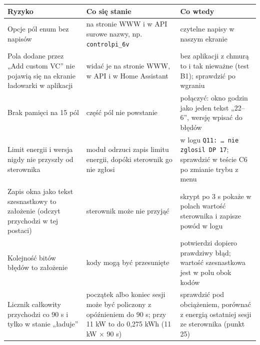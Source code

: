 \documentclass[11pt,a4paper]{article}
\begin{document}
\begin{longtable}{>{\raggedright\arraybackslash}p{4.64cm}>{\raggedright\arraybackslash}p{4.61cm}>{\raggedright\arraybackslash}p{6.03cm}}
\toprule
\rowcolor{apteallight}\textbf{Ryzyko} & \textbf{Co się stanie} & \textbf{Co wtedy} \\
\midrule\endhead
\bottomrule\endfoot
Opcje pól enum bez napisów & na stronie WWW i w API surowe nazwy, np. \texttt{controlpi\_6v} & czytelne napisy w naszym ekranie \\
Pola dodane przez „Add custom VC” nie pojawią się na ekranie ładowarki w aplikacji & widać je na stronie WWW, w API i w Home Assistant & bez aplikacji z chmurą to i tak nieważne (test B1); sprawdzić po wgraniu \\
Brak pamięci na 15 pól & część pól nie powstanie & połączyć: okno godzin jako jeden tekst „22–6”, wersję wpisać do błędów \\
Limit energii i wersja nigdy nie przyszły od sterownika & moduł odrzuci zapis limitu energii, dopóki sterownik go nie zgłosi & w logu \texttt{Q11:\allowbreak{} … nie zglosil DP 17}; sprawdzić w teście C6 po zmianie trybu z menu \\
Zapis okna jako tekst szesnastkowy to założenie (odczyt przychodzi w tej postaci) & sterownik może nie przyjąć & skrypt po 3 s pokaże w polach wartość sterownika i zapisze powód w logu \\
Kolejność bitów błędów to założenie & kody mogą być przesunięte & potwierdzi dopiero prawdziwy błąd; wartość szesnastkowa jest w polu obok kodów \\
Licznik całkowity przychodzi co 90 s i tylko w stanie „ładuje” & początek albo koniec sesji może być policzony z opóźnieniem do 90 s; przy 11 kW to do 0,275 kWh (11 kW × 90 s) & sprawdzić pod obciążeniem, porównać z energią ostatniej sesji ze sterownika (punkt 25) \\
\end{longtable}
\end{document}
